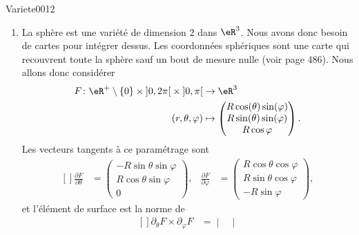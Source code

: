 
\begin{corrige}{Variete0012}

	\begin{enumerate}

		\item
			La sphère est une variété de dimension $2$ dans $\eR^3$. Nous avons donc besoin de cartes pour intégrer dessus. Les coordonnées sphériques sont une carte qui recouvrent toute la sphère sauf un bout de mesure nulle (voir page $486$). Nous allons donc considérer
			\begin{equation}
				\begin{aligned}
					F\colon \eR^+\setminus\{ 0 \}\times\mathopen] 0 , 2\pi \mathclose[\times\mathopen] 0 , \pi \mathclose[&\to \eR^3 \\
					(r,\theta,\varphi)&\mapsto \begin{pmatrix}
						R\cos(\theta)\sin(\varphi)	\\ 
						R\sin(\theta)\sin(\varphi)	\\ 
						R\cos\varphi	
					\end{pmatrix}.
				\end{aligned}
			\end{equation}
			Les vecteurs tangents à ce paramétrage sont
			\begin{equation}
				\begin{aligned}[]
					\frac{ \partial F }{ \partial \theta }&=\begin{pmatrix}
						-R\sin\theta\sin\varphi	\\ 
						R\cos\theta\sin\varphi	\\ 
						0	
					\end{pmatrix},
					&\frac{ \partial F }{ \partial \varphi }&=\begin{pmatrix}
						R\cos\theta\cos\varphi	\\ 
						R\sin\theta\cos\varphi	\\ 
						-R\sin\varphi	
					\end{pmatrix},
				\end{aligned}
			\end{equation}
			et l'élément de surface est la norme de 
			\begin{equation}
				\begin{aligned}[]
					\partial_\theta F\times\partial_{\varphi}F
					&=\begin{vmatrix}

\end{vmatrix}
\end{aligned}
\end{equation}
\end{enumerate}
\end{corrige}
